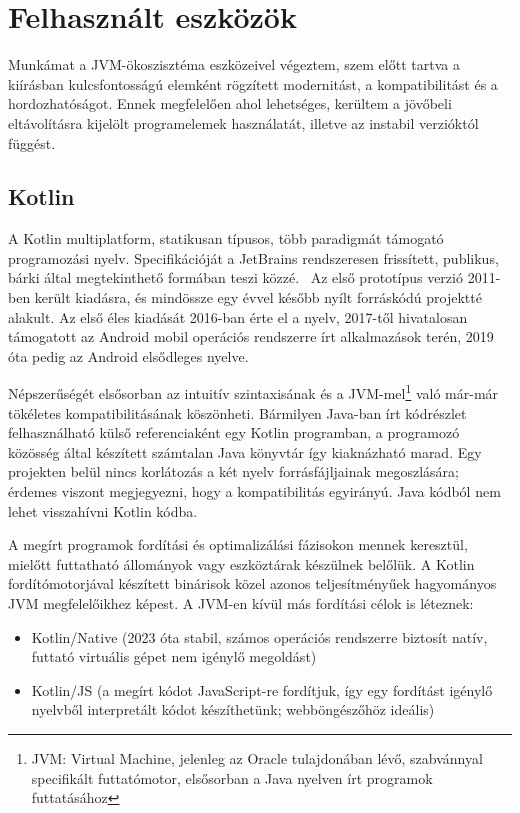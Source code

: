 \chapter{Felhasznált eszközök}
\label{sec:LatexTools}

Munkámat a JVM-ökoszisztéma eszközeivel végeztem, szem előtt tartva a kiírásban kulcsfontosságú elemként rögzített modernitást, a kompatibilitást és a hordozhatóságot. Ennek megfelelően ahol lehetséges, kerültem a jövőbeli eltávolításra kijelölt programelemek használatát, illetve az instabil verzióktól függést.
\section{Kotlin }

A Kotlin multiplatform, statikusan típusos, több paradigmát támogató programozási nyelv. Specifikációját a JetBrains rendszeresen frissített, publikus, bárki által megtekinthető formában teszi közzé.~\cite{KotlinSpec} Az első prototípus verzió 2011-ben került kiadásra, és mindössze egy évvel később nyílt forráskódú projektté alakult. Az első éles kiadását 2016-ban érte el a nyelv, 2017-től hivatalosan támogatott az Android mobil operációs rendszerre írt alkalmazások terén, 2019 óta pedig az Android elsődleges nyelve.~\cite{KotlinPast}

Népszerűségét elsősorban az intuitív szintaxisának és a JVM-mel\footnote{JVM: \@Java Virtual Machine, jelenleg az Oracle tulajdonában lévő, szabvánnyal specifikált futtatómotor, elsősorban a Java nyelven írt programok futtatásához } való már-már tökéletes kompatibilitásának köszönheti. Bármilyen Java-ban írt kódrészlet felhasználható külső referenciaként egy Kotlin programban, a programozó közösség által készített számtalan Java könyvtár így kiaknázható marad.  Egy projekten belül nincs korlátozás a két nyelv forrásfájljainak megoszlására; érdemes viszont megjegyezni, hogy a kompatibilitás egyirányú. Java kódból nem lehet visszahívni Kotlin kódba.

A megírt programok fordítási és optimalizálási fázisokon mennek keresztül, mielőtt futtatható állományok vagy eszköztárak készülnek belőlük. A Kotlin fordítómotorjával készített binárisok közel azonos teljesítményűek hagyományos JVM megfelelőikhez képest. A JVM-en kívül más fordítási célok is léteznek:
\begin{itemize}
    \item Kotlin/Native (2023 óta stabil, számos operációs rendszerre biztosít natív, futtató virtuális gépet nem igénylő megoldást)
    \item Kotlin/JS (a megírt kódot JavaScript-re fordítjuk, így egy fordítást igénylő nyelvből interpretált kódot készíthetünk; webböngészőhöz ideális)
\end{itemize}

